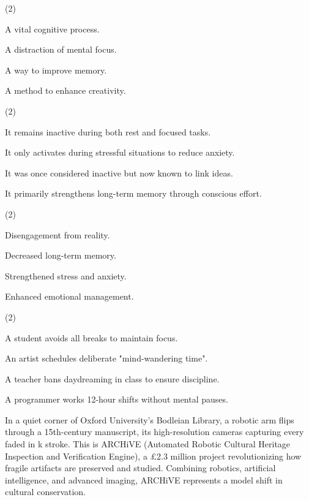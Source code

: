\documentclass{英语试卷}
\begin{document}
\begin{choices}(2)
  \item A vital cognitive process.
  \item A distraction of mental focus.
  \item A way to improve memory.
  \item A method to enhance creativity.
\end{choices}
\begin{choices}(2)
  \item It remains inactive during both rest and focused tasks.
  \item It only activates during stressful situations to reduce anxiety.
  \item It was once considered inactive but now known to link ideas.
  \item It primarily strengthens long-term memory through conscious effort.
\end{choices}
\begin{choices}(2)
  \item Disengagement from reality.
  \item Decreased long-term memory.
  \item Strengthened stress and anxiety.
  \item Enhanced emotional management.
\end{choices}
\begin{choices}(2)
  \item A student avoids all breaks to maintain focus.
  \item An artist schedules deliberate "mind-wandering time".
  \item A teacher bans daydreaming in class to ensure discipline.
  \item A programmer works 12-hour shifts without mental pauses.
\end{choices}
\par In a quiet corner of Oxford University's Bodleian Library, a robotic arm flips through a 15th-century manuscript, its high-resolution cameras capturing every faded in k stroke. This is ARCHiVE (Automated Robotic Cultural Heritage Inspection and Verification Engine), a £2.3 million project revolutionizing how fragile artifacts are preserved and studied. Combining robotics, artificial intelligence, and advanced imaging, ARCHiVE represents a model shift in cultural conservation.\par
\end{document}
